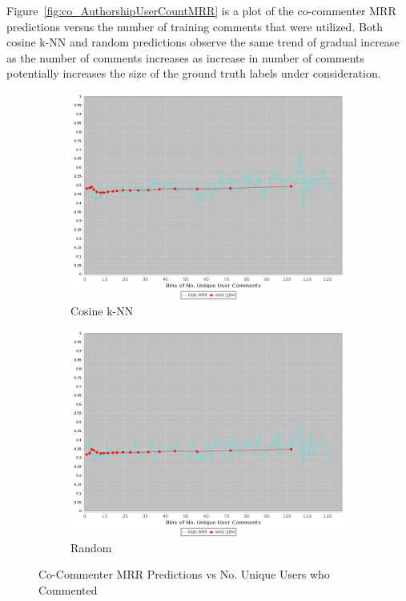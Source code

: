 Figure~\ref{fig:co_AuthorshipUserCountMRR} is a plot of the co-commenter MRR predictions versus the number of training comments that were utilized. Both cosine k-NN and random predictions observe the same trend of gradual increase as the number of comments increases as increase in number of comments potentially increases the size of the ground truth labels under consideration.

\begin{figure}[!h]
\centering
\begin{subfigure}[b]{0.475\textwidth}
    \centering
    \includegraphics[width=\textwidth]{c-inv_images/co_AuthorshipItemCountMRR.jpeg}
    \caption{Cosine k-NN}
\end{subfigure}
\begin{subfigure}[b]{0.475\textwidth}
    \centering
    \includegraphics[width=\textwidth]{c-inv_images/randCo_AuthorshipItemCountMRR.jpeg}
    \caption{Random}
\end{subfigure}
\caption{Co-Commenter MRR Predictions vs No. Unique Users who Commented}
\label{fig:co_AuthorshipItemCountMRR}
\end{figure}

